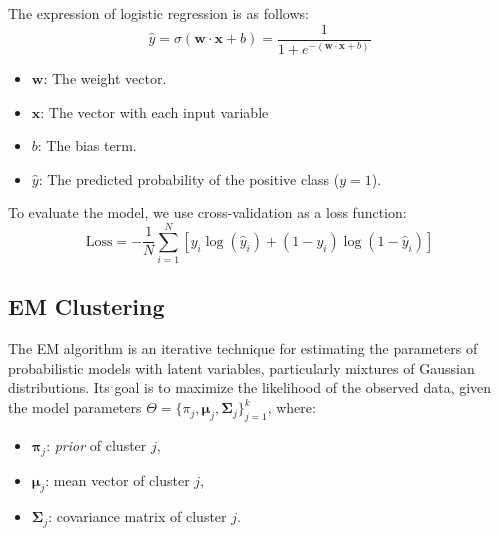 \documentclass[a4paper,12pt]{article}
\begin{document}
The expression of logistic regression is as follows:
\[
\hat{y} = \sigma(\mathbf{w} \cdot \mathbf{x} + b) =\frac{1}{1 + e^{-(\mathbf{w} \cdot \mathbf{x} + b)}}
\]

\begin{itemize}
    \item \(\mathbf{w}\): The weight vector.
    \item \(\mathbf{x}\): The vector with each input variable
    \item \(b\): The bias term.
    \item \(\hat{y}\): The predicted probability of the positive class (\(y=1\)). 
\end{itemize}

To evaluate the model, we use cross-validation as a loss function:
\[
\text{Loss} = -\frac{1}{N} \sum_{i=1}^{N} \left[ y_i \log(\hat{y}_i) + (1-y_i) \log(1-\hat{y}_i) \right]
\]

\subsection{EM Clustering}
The EM algorithm is an iterative technique for estimating the parameters of probabilistic models with latent variables, particularly mixtures of Gaussian distributions. Its goal is to maximize the likelihood of the observed data, given the model parameters \(\Theta = \{\pi_j, \boldsymbol{\mu}_j, \boldsymbol{\Sigma}_j\}_{j=1}^k\), where:  
\begin{itemize}
    \item \(\boldsymbol{\pi}_j\): \textit{prior} of cluster \(j\),
    \item \(\boldsymbol{\mu}_j\): mean vector of cluster \(j\),
    \item \(\boldsymbol{\Sigma}_j\): covariance matrix of cluster \(j\).
\end{itemize}
\end{document}
